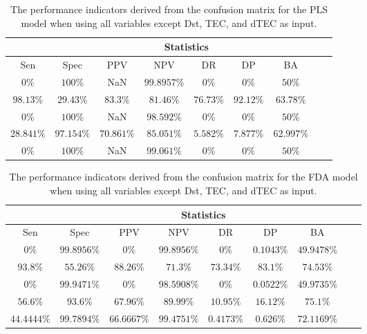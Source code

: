 \begin{table}[!ht]
	\centering
	\begin{tabular}{|c|c|c|c|c|c|c|c|c|}
		\hline
		 & \multicolumn{7}{c|}{Statistics} \\ \hline
		Sen & Spec & PPV & NPV & DR & DP & BA \\ \hline
		$0\%$ & $100\%$ & NaN & $99.8957\%$ & $0\%$ & $0\%$ & $50\%$ \\ \hline
		$98.13\%$ & $29.43\%$ & $83.3\%$ & $81.46\%$ & $76.73\%$ & $92.12\%$ & $63.78\%$ \\ \hline
		$0\%$ & $100\%$ & NaN & $98.592\%$ & $0\%$ & $0\%$ & $50\%$ \\ \hline
		$28.841\%$ & $97.154\%$ & $70.861\%$ & $85.051\%$ & $5.582\%$ & $7.877\%$ & $62.997\%$ \\ \hline
		$0\%$ & $100\%$ & NaN & $99.061\%$ & $0\%$ & $0\%$ & $50\%$ \\ \hline
	\end{tabular}
	\caption{The performance indicators derived from the confusion matrix for the PLS model when using all variables except Dst, TEC, and dTEC as input.}
	\label{tab:cs:noTEC:pls}
\end{table}

\begin{table}[!ht]
	\centering
	\begin{tabular}{|c|c|c|c|c|c|c|c|c|}
		\hline
		 & \multicolumn{7}{c|}{Statistics} \\ \hline
		Sen & Spec & PPV & NPV & DR & DP & BA \\ \hline
		$0\%$ & $99.8956\%$ & $0\%$ & $99.8956\%$ & $0\%$ & $0.1043\%$ & $49.9478\%$ \\ \hline
		$93.8\%$ & $55.26\%$ & $88.26\%$ & $71.3\%$ & $73.34\%$ & $83.1\%$ & $74.53\%$ \\ \hline
		$0\%$ & $99.9471\%$ & $0\%$ & $98.5908\%$ & $0\%$ & $0.0522\%$ & $49.9735\%$ \\ \hline
		$56.6\%$ & $93.6\%$ & $67.96\%$ & $89.99\%$ & $10.95\%$ & $16.12\%$ & $75.1\%$ \\ \hline
		$44.4444\%$ & $99.7894\%$ & $66.6667\%$ & $99.4751\%$ & $0.4173\%$ & $0.626\%$ & $72.1169\%$ \\ \hline
	\end{tabular}
	\caption{The performance indicators derived from the confusion matrix for the FDA model when using all variables except Dst, TEC, and dTEC as input.}
	\label{tab:cs:noTEC:fda}
\end{table}

